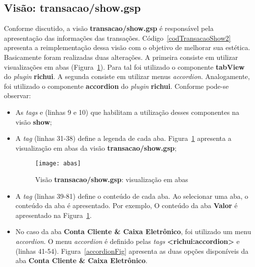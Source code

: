 \newpage

\subsection{Visão: transacao/show.gsp}

\vspace{0.5cm}

Conforme  discutido,  a  visão   {\bf  transacao/show.gsp}  é  responsável  pela
apresentação  das  informações  das transações.   Código~\ref{codTransacaoShow2}
apresenta a reimplementação dessa visão com o objetivo de melhorar sua estética.
Basicamente foram  realizadas duas alterações.  A primeira  consiste em utilizar
visualizações  em  abas  (Figura~\ref{abasFig}).    Para  tal  foi  utilizado  o
componente {\bf  tabView} do {\it plugin}  {\bf richui}.  A  segunda consiste em
utilizar menus  {\it accordion}. Analogamente,  foi utilizado o  componente {\bf
  accordion} do {\it plugin} {\bf richui}. Conforme pode-se observar: 

\vspace{0.4cm}

\begin{itemize}

\item As {\it tags} {\bf<resource:tabView>} e {\bf <resource:accordion>} (linhas
  9 e 10) que habilitam a utilização desses componentes na visão {\bf show}; 

\vspace{0.4cm}

\item A  {\it tag}  {\bf <richui:tabLabel>} (linhas  31-38) define a  legenda de
  cada aba.  Figura~\ref{abasFig} apresenta a visualização em abas da visão {\bf
    transacao/show.gsp}; 

\vspace{0.4cm}

\begin{figure}[htbp]
\centering
\texttt{[image: abas]}
\caption{Visão {\bf transacao/show.gsp}: visualização em abas}
\label{abasFig}
\end{figure}

\vspace{0.4cm}

\item A {\it tag} {\bf  <richui:tabContent>} (linhas 39-81) define o conteúdo de
  cada  aba. Ao  selecionar  uma aba,  o  conteúdo da  aba  é apresentado.   Por
  exemplo, O conteúdo da aba {\bf Valor} é apresentado na Figura~\ref{abasFig}.  

\vspace{0.4cm}

\item No caso  da aba {\bf Conta Cliente \& Caixa  Eletrônico}, foi utilizado um
  menu {\it accordion}.  O menu {\it accordion} é definido pelas {\it tags} {\bf
    <richui:accordion>}      e     {\bf      <richui:accordionItem>}     (linhas
  41-54). Figura~\ref{accordionFig} apresenta as  duas opções disponíveis da aba
  {\bf Conta Cliente \& Caixa Eletrônico}. 

\end{itemize}


